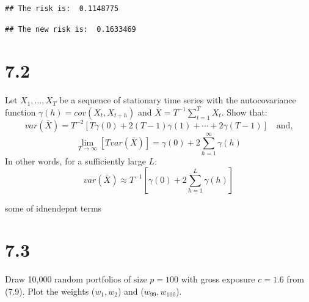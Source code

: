 \documentclass[11pt,]{article}
\newenvironment{Shaded}{\begin{snugshade}}{\end{snugshade}}
\newcommand{\CharTok}[1]{\textcolor[rgb]{0.31,0.60,0.02}{#1}}
\newcommand{\CommentTok}[1]{\textcolor[rgb]{0.56,0.35,0.01}{\textit{#1}}}
\newcommand{\DecValTok}[1]{\textcolor[rgb]{0.00,0.00,0.81}{#1}}
\newcommand{\KeywordTok}[1]{\textcolor[rgb]{0.13,0.29,0.53}{\textbf{#1}}}
\newcommand{\NormalTok}[1]{#1}
\newcommand{\OperatorTok}[1]{\textcolor[rgb]{0.81,0.36,0.00}{\textbf{#1}}}
\newcommand{\StringTok}[1]{\textcolor[rgb]{0.31,0.60,0.02}{#1}}
\renewenvironment{quote}{\begin{shaded*}}{\end{shaded*}}
\begin{document}
\begin{verbatim}
## The risk is:  0.1148775
\end{verbatim}

\begin{Shaded}
\end{Shaded}

\begin{verbatim}
## The new risk is:  0.1633469
\end{verbatim}

\hypertarget{section-1}{%
\section{7.2}\label{section-1}}

Let \(X_1, \ldots, X_T\) be a sequence of stationary time series with
the autocovariance function \(\gamma(h) = cov(X_t, X_{t+h})\) and
\(\bar{X} = T^{-1} \sum_{t=1}^T X_t\). Show that: \[
var(\bar{X}) = T^{-2}[T \gamma(0) + 2(T-1)\gamma(1) + \cdots + 2\gamma(T-1)] \quad \text{and,}
\] \[
\lim_{T \rightarrow \infty}[T var(\bar{X})] = \gamma(0) + 2\sum_{h=1}^\infty \gamma(h)
\] In other words, for a sufficiently large \(L\): \[
var(\bar{X}) \approx T^{-1} [\gamma(0) + 2\sum_{h=1}^L \gamma(h)]
\]

\begin{quote}
some of idnendepnt terms
\end{quote}

\hypertarget{section-2}{%
\section{7.3}\label{section-2}}

Draw 10,000 random portfolios of size \(p=100\) with gross exposure
\(c=1.6\) from (7.9). Plot the weights (\(w_1, w_2\)) and
(\(w_{99}, w_{100}\)).
\end{document}
